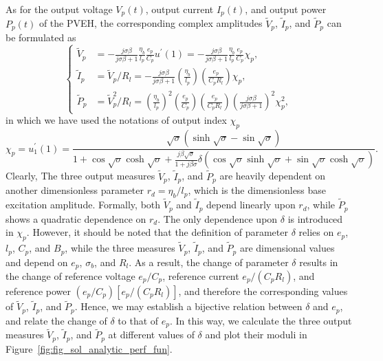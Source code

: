 \documentclass{svjour3}                     %
\begin{document}
As for the output voltage $V_p(t)$, output current $I_p(t)$, and output power $P_p(t)$ of the PVEH, the corresponding complex amplitudes $\tilde{V}_p$, $\tilde{I}_p$, and $\tilde{P}_p$ can be formulated as
\begin{equation}
    \left\{\begin{aligned}
        \tilde{V}_p &= -\frac{j \sigma \beta}{j \sigma \beta + 1} \frac{\eta_b}{l_p} \frac{e_p}{C_p} u^\prime(1) = -\frac{j \sigma \beta}{j \sigma \beta + 1} \frac{\eta_b}{l_p} \frac{e_p}{C_p} \chi_p, \\
        \tilde{I}_p &=  \tilde{V}_p / R_l = - \frac{ j \sigma \beta } {j \sigma \beta + 1} \left( \frac{\eta_b}{l_p} \right) \left( \frac{e_p}{C_p R_l} \right) \chi_p , \\
        \tilde{P}_p &=  \tilde{V}_p^2 / R_l = \left(\frac{\eta_b}{l_p}\right)^2 \left(\frac{e_p}{C_p}\right) \left( \frac{e_p}{C_p R_l} \right) \left( \frac{ j \sigma \beta}{ j \sigma \beta + 1 } \right)^2 \chi_p^2,
    \end{aligned}\right.
    \label{eq:eq_peh_perfs_compact_form}
\end{equation}
in which we have used the notations of output index $\chi_p$ 
\begin{equation}
    \chi_p = u_1^\prime(1) = \frac{ \sqrt{\sigma} \left( \sinh\sqrt{\sigma} - \sin\sqrt{\sigma} \right) }{ 1 + \cos\sqrt{\sigma } \cosh\sqrt{\sigma } + \frac{j \beta \sqrt{\sigma}}{ 1+ j \beta \sigma } \delta \left( \cos\sqrt{\sigma } \sinh\sqrt{\sigma } + \sin\sqrt{\sigma } \cosh\sqrt{\sigma } \right) }.
    \label{eq:eq_peh_perfs_compact_form_end_ders}
\end{equation}
Clearly, The three output measures $\tilde{V}_p$, $\tilde{I}_p$, and $\tilde{P}_p$ are heavily dependent on another dimensionless parameter $r_d = \eta_b/l_p$, which is the dimensionless base excitation amplitude. Formally, both $\tilde{V}_p$ and $\tilde{I}_p$ depend linearly upon $r_d$, while $\tilde{P}_p$ shows a quadratic dependence on $r_d$. The only dependence upon $\delta$ is introduced in $\chi_p$. However, it should be noted that the definition of parameter $\delta$ relies on $e_p$, $l_p$, $C_p$, and $B_p$, while the three measures $\tilde{V}_p$, $\tilde{I}_p$, and $\tilde{P}_p$ are dimensional values and depend on $e_p$, $\sigma_b$, and $R_l$. As a result, the change of parameter $\delta$ results in the change of reference voltage $e_p / C_p$, reference current $e_p / (C_p R_l)$, and reference power $(e_p / C_p)[e_p / (C_p R_l)]$, and therefore the corresponding values of $\tilde{V}_p$, $\tilde{I}_p$, and $\tilde{P}_p$. Hence, we may establish a bijective relation between $\delta$ and $e_p$, and relate the change of $\delta$ to that of $e_p$. In this way, we calculate the three output measures $\tilde{V}_p$, $\tilde{I}_p$, and $\tilde{P}_p$ at different values of $\delta$ and plot their moduli in Figure~\ref{fig:fig_sol_analytic_perf_fun}.
\end{document}
